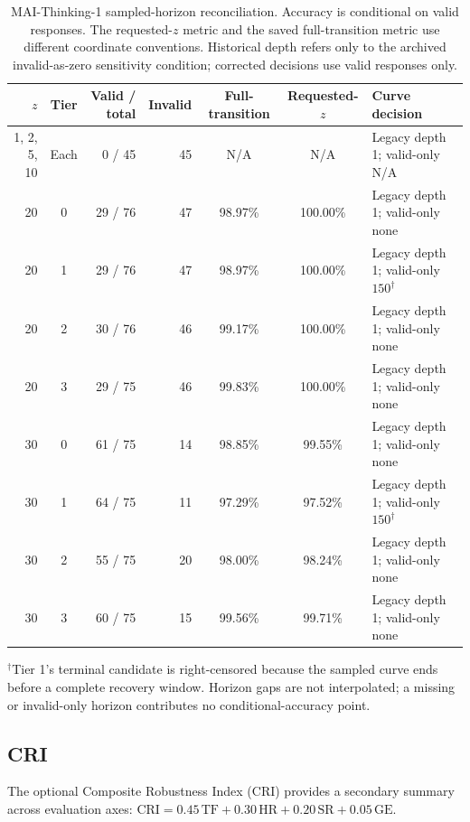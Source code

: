 \documentclass{article}
\begin{document}
\begin{table}[H]
\centering
\caption{MAI-Thinking-1 sampled-horizon reconciliation. Accuracy is conditional on valid responses. The requested-$z$ metric and the saved full-transition metric use different coordinate conventions. Historical depth refers only to the archived invalid-as-zero sensitivity condition; corrected decisions use valid responses only.}
\label{tab:mai_fracture_reconciliation}
\scriptsize
\setlength{\tabcolsep}{3.2pt}
\begin{tabular}{r c r r c c l}
\toprule
\textbf{$z$} & \textbf{Tier} & \textbf{Valid / total} & \textbf{Invalid} &
\textbf{Full-transition} & \textbf{Requested-$z$} & \textbf{Curve decision} \\
\midrule
1, 2, 5, 10 & Each & 0 / 45 & 45 & N/A & N/A &
Legacy depth 1; valid-only N/A \\
20 & 0 & 29 / 76 & 47 & 98.97\% & 100.00\% &
Legacy depth 1; valid-only none \\
20 & 1 & 29 / 76 & 47 & 98.97\% & 100.00\% &
Legacy depth 1; valid-only $150^\dagger$ \\
20 & 2 & 30 / 76 & 46 & 99.17\% & 100.00\% &
Legacy depth 1; valid-only none \\
20 & 3 & 29 / 75 & 46 & 99.83\% & 100.00\% &
Legacy depth 1; valid-only none \\
30 & 0 & 61 / 75 & 14 & 98.85\% & 99.55\% &
Legacy depth 1; valid-only none \\
30 & 1 & 64 / 75 & 11 & 97.29\% & 97.52\% &
Legacy depth 1; valid-only $150^\dagger$ \\
30 & 2 & 55 / 75 & 20 & 98.00\% & 98.24\% &
Legacy depth 1; valid-only none \\
30 & 3 & 60 / 75 & 15 & 99.56\% & 99.71\% &
Legacy depth 1; valid-only none \\
\bottomrule
\end{tabular}
\end{table}

$^\dagger$Tier 1's terminal candidate is right-censored because the sampled
curve ends before a complete recovery window. Horizon gaps are not interpolated;
a missing or invalid-only horizon contributes no conditional-accuracy point.

\subsection{CRI}
\label{app:CRI}
The optional Composite Robustness Index (CRI) provides a secondary summary across evaluation axes:
 $\text{CRI} = 0.45\,\text{TF}
+0.30\,\text{HR}
+0.20\,\text{SR}
+0.05\,\text{GE}$.
\end{document}
